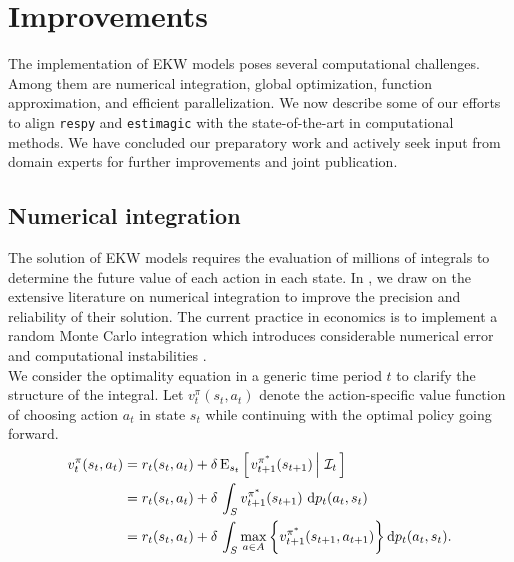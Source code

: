 \section{Improvements}\label{Computation}
The implementation of EKW models poses several computational challenges. Among them are numerical integration, global optimization, function approximation, and efficient parallelization. We now describe some of our efforts to align \verb+respy+ and \verb+estimagic+ with the state-of-the-art in computational methods. We have concluded our preparatory work and actively seek input from domain experts for further improvements and joint publication.
\subsection{Numerical integration}
The solution of EKW models requires the evaluation of millions of integrals to determine the future value of each action in each state. In \citet{Gabler.2020a}, we draw on the extensive literature on numerical integration \citep{Davis.2007, Gerstner.1998} to improve the precision and reliability of their solution. The current practice in economics is to implement a random Monte Carlo integration which introduces considerable numerical error and computational instabilities \citep{Judd.2011}.\\

\noindent We consider the optimality equation in a generic time period $t$ to clarify the structure of the integral. Let $v^{\pi}_{t}(s_t, a_t)$ denote the action-specific value function of choosing action $a_t$ in state $s_t$ while continuing with the optimal policy going forward.
%
\begin{align*}
v^{\pi}_{t}(s_t, a_t) & = r_t(s_t, a_t) + \delta\,\mathrm{E}_{s_t} \left[\left.v^{\pi^*}_{t + 1}(s_{t + 1})\,\right\vert\,\mathcal{I}_t\,\right] \\
& =  r_t(s_t, a_t) + \delta\, \int_S v^{\pi^*}_{t + 1}(s_{t + 1})\, \mathop{}\!\mathrm{d} p_t(a_t, s_t)\\
& =  r_t(s_t, a_t) + \delta\, \int_S \max_{a \in A}\bigg\{v^{\pi^*}_{t + 1}(s_{t + 1}, a_{t + 1})\bigg\}\mathop{}\!\mathrm{d} p_t(a_t, s_t).
\end{align*}

